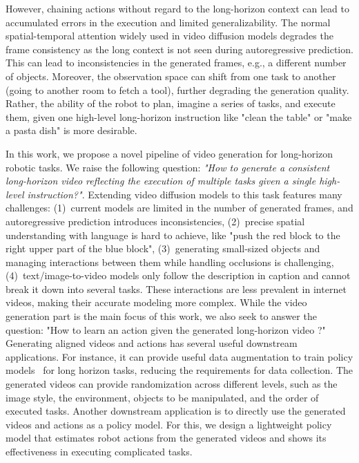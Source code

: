 \documentclass[letterpaper, 10 pt, conference]{ieeeconf}  %
\begin{document}
However, chaining actions without regard to the long-horizon context can lead to accumulated errors in the execution and limited generalizability. The normal spatial-temporal attention widely used in video diffusion models degrades the frame consistency as the long context is not seen during autoregressive prediction. This can lead to inconsistencies in the generated frames, e.g., a different number of objects. Moreover, the observation space can shift from one task to another (going to another room to fetch a tool), further degrading the generation quality. Rather, the ability of the robot to plan, imagine a series of tasks, and execute them, given one high-level long-horizon instruction like "clean the table" or "make a pasta dish" is more desirable.



In this work, we propose a novel pipeline of video generation for long-horizon robotic tasks. We raise the following question: \textit{"How to generate a consistent long-horizon video reflecting the execution of multiple tasks given a single high-level instruction?"}. Extending video diffusion models to this task features many challenges: (1)~current models are limited in the number of generated frames, and autoregressive prediction introduces inconsistencies, (2)~precise spatial understanding with language is hard to achieve, like "push the red block to the right upper part of the blue block", (3)~generating small-sized objects and managing interactions between them while handling occlusions is challenging, (4)~text/image-to-video models only follow the description in caption and cannot break it down into several tasks. These interactions are less prevalent in internet videos, making their accurate modeling more complex. While the video generation part is the main focus of this work, we also seek to answer the question: "How to learn an action given the generated long-horizon video ?" Generating aligned videos and actions has several useful downstream applications. For instance, it can provide useful data augmentation to train policy models~\cite{pi_0, rdtb, diffpolicy, gr2, vlp} for long horizon tasks, reducing the requirements for data collection. The generated videos can provide randomization across different levels, such as the image style, the environment, objects to be manipulated, and the order of executed tasks. Another downstream application is to directly use the generated videos and actions as a policy model. For this, we design a lightweight policy model that estimates robot actions from the generated videos and shows its effectiveness in executing complicated tasks. 
\end{document}
